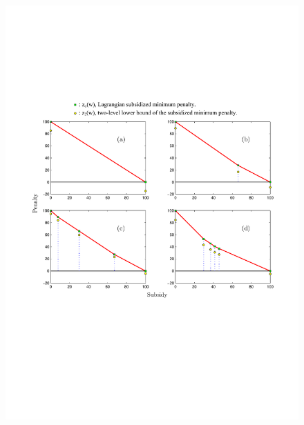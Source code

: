 \documentclass[11pt]{article}
\begin{document}
\begin{figure}[H]
\centering
\includegraphics[width=1\textwidth]{1.pdf}
\centering
\end{figure}
\end{document}
